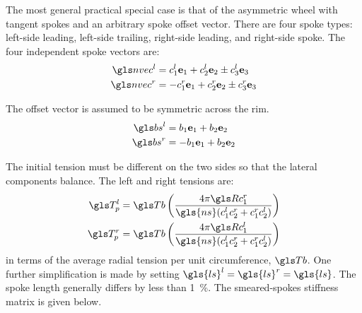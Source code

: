 \documentclass[../../thesis.tex]{subfiles}
\begin{document}
The most general practical special case is that of the asymmetric wheel with tangent spokes and an arbitrary spoke offset vector. There are four spoke types: left-side leading, left-side trailing, right-side leading, and right-side spoke. The four independent spoke vectors are:
\begin{subequations}
\begin{align}
\n^l &= c_1^l \eo + c_2^l \et \pm c_3^l \eh\\
\n^r &= -c_1^r \eo + c_2^r \et \pm c_3^r \eh
\end{align}
\end{subequations}

The offset vector is assumed to be symmetric across the rim.
\begin{subequations}
\begin{align}
\bs^l &= b_1 \eo + b_2 \et\\
\bs^r &= -b_1 \eo + b_2 \et
\end{align}
\end{subequations}

The initial tension must be different on the two sides so that the lateral components balance. The left and right tensions are:
\begin{subequations}
\begin{align}
\T_p^l &= \Tb \left(\frac{4\pi \R c_1^r}{\gls{ns}(c_1^lc_2^r + c_1^rc_2^l)}\right)\\
\T_p^r &= \Tb \left(\frac{4\pi \R c_1^l}{\gls{ns}(c_1^lc_2^r + c_1^rc_2^l)}\right)
\end{align}
\end{subequations}
in terms of the average radial tension per unit circumference, $\Tb$. One further simplification is made by setting $\gls{ls}^l=\gls{ls}^r=\gls{ls}$. The spoke length generally differs by less than \SI{1}{\percent}. The smeared-spokes stiffness matrix is given below.
\end{document}
